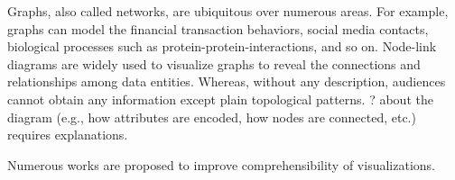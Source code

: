 \maketitle

Graphs, also called networks, are ubiquitous over numerous areas. For example, graphs can model the financial transaction behaviors, social media contacts, biological processes such as protein-protein-interactions, and so on.
Node-link diagrams are widely used to visualize graphs to reveal the connections and relationships among data entities.
Whereas, without any description, audiences cannot obtain any information except plain topological patterns.
{\color{red}{Basic questions}?} about the diagram (e.g., how attributes are encoded, how nodes are connected, etc.) requires explanations.

Numerous works are proposed to improve comprehensibility of visualizations.




